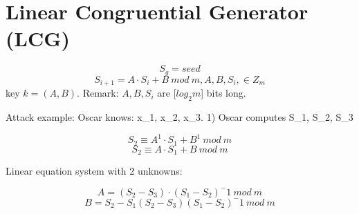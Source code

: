 \documentclass[a4paper]{article}
\begin{document}
\section{Linear Congruential Generator (LCG)}

        $$S_g = seed $$
        $$S_{i+1} = A \cdot S_i + B \ mod \ m, A,B,S_i, \in  Z_m$$
        key $ k=(A,B)$. Remark: $A,B,S_i$ are [$log_2m$] bits long.
       
        Attack example: Oscar knows: x_1, x_2, x_3.
        1) Oscar computes S_1, S_2, S_3

        $$S_2 \equiv A^1 \cdot S_1 + B^1 \ mod \ m$$
        $$S_2 \equiv A \cdot S_1 + B \ mod \ m$$

        Linear equation system with 2 unknowns: 

        $$ A = (S_2 - S_3) \cdot (S_1 - S_2)^-1 \ mod \ m$$
        $$ B = S_2 - S_1 (S_2 - S_3) (S_1 - S_2)^-1 \ mod \ m$$
\end{document}

